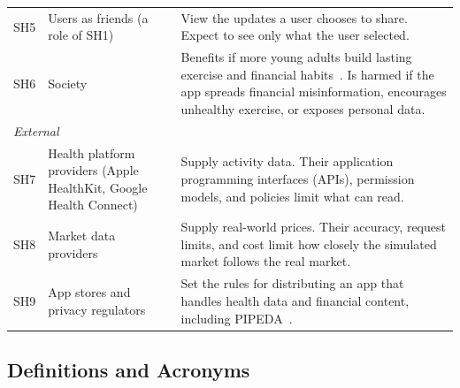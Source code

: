 \documentclass[12pt]{article}
\begin{document}
\begin{table}[H]
\begin{tabularx}{\textwidth}{l>{\raggedright\arraybackslash}p{}X}
    \midrule
    SH5         & Users as friends (a role of SH1)                                                    & View the updates a user chooses to share. Expect to
    see only what the user selected.                                                                                                            \\
    SH6         & Society                                                            & Benefits if more young adults build lasting exercise and
    financial habits~\citep{CSEP2020, FCAC2021}. Is harmed if the app spreads
    financial misinformation, encourages unhealthy exercise, or exposes personal
    data.                                                                                                                                       \\
    \midrule
    \multicolumn{3}{l}{\textit{External}}                                                                                                       \\
    \midrule
    SH7         & Health platform providers (Apple HealthKit, Google Health Connect) &
    Supply activity data. Their application programming interfaces (APIs),
    permission models, and policies limit what \progname{} can read.                                                                            \\
    SH8         & Market data providers                                              & Supply real-world prices. Their accuracy, request
    limits, and cost limit how closely the simulated market follows the real
    market.                                                                                                                                     \\
    SH9         & App stores and privacy regulators                                  & Set the rules for distributing an app
    that handles health data and financial content, including
    PIPEDA~\citep{PIPEDA}.                                                                                                                      \\
    \bottomrule
  \end{tabularx}
\end{table}

\subsection{Definitions and Acronyms}

\end{document}
